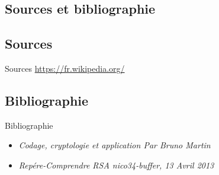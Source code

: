 \documentclass[10pt]{beamer}
\begin{document}
\begin{frame}
\section{Sources et bibliographie}
\subsection{Sources}
\begin{block}{Sources}
\url{https://fr.wikipedia.org/}
\end{block}
\subsection{Bibliographie}
\begin{block}{Bibliographie}
\begin{itemize}
\item \emph{Codage, cryptologie et application \newline Par Bruno Martin}
\item \emph{Rep\'{e}re-Comprendre RSA \newline nico34-buffer, 13 Avril 2013}

\end{itemize}
\end{block}
\end{frame}
\end{document}
